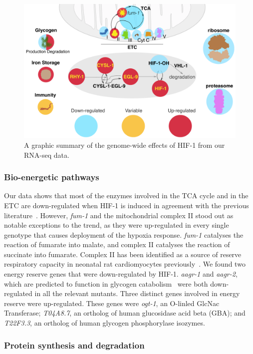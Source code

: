 \documentclass[9pt,twocolumn,twoside]{pnas-new}
\newcommand{\gene}[1]{\emph{#1}}
\newcommand{\hifp}{HIF-1}
\begin{document}
\begin{figure}[tbhp]
\centering
\includegraphics[width=\linewidth]{figs/hif1genomewide.pdf}
\caption{
A graphic summary of the genome-wide effects of \hifp{} from our RNA-seq data.
}
\label{fig:genomewide}
\end{figure}

\subsubsection{Bio-energetic pathways}
Our data shows that most of the enzymes involved in the TCA cycle and in the ETC
are down-regulated when \hifp{} is induced in agreement with the previous
literature~\cite{Semenza2012}.
However, \gene{fum-1} and the mitochondrial complex II stood out as notable
exceptions to the trend, as they were up-regulated in every single genotype that
causes deployment of the hypoxia response. \gene{fum-1} catalyses the reaction
of fumarate into malate, and complex II catalyses the reaction of succinate into
fumarate. Complex II has been identified as a source of reserve respiratory
capacity in neonatal rat cardiomyocytes previously~\cite{Pfleger2015}.
We found two energy reserve genes that were down-regulated by \hifp{}.
\gene{aagr-1} and \gene{aagr-2}, which are predicted to function in glycogen
catabolism~\cite{Sikora2010} were both down-regulated in all the relevant mutants.
Three distinct genes involved in energy reserve were up-regulated. These genes were
\gene{ogt-1}, an O-linled GlcNac Transferase; \gene{T04A8.7}, an ortholog of human
glucosidase acid beta (GBA); and \gene{T22F3.3}, an ortholog of human glycogen
phosphorylase isozymes.

\subsubsection{Protein synthesis and degradation}
\end{document}
